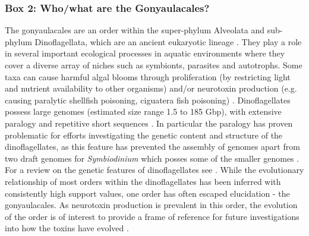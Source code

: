 \documentclass[12pt]{article}
\begin{document}
\subsubsection{Box 2: Who/what are the Gonyaulacales?}
\label{sec:dinobox}
The gonyaulacales are an order within the super-phylum Alveolata and sub-phylum Dinoflagellata, which are an ancient eukaryotic lineage \cite{moldowan1998biogeochemical}. 
They play a role in several important ecological processes in aquatic environments where they cover a diverse array of niches such as symbionts, parasites and autotrophs. 
Some taxa can cause harmful algal blooms through proliferation (by restricting light and nutrient availability to other organisms) and/or neurotoxin production (e.g. causing paralytic shellfish poisoning, ciguatera fish poisoning) \cite{murray2016unravelling}.
Dinoflagellates possess large genomes (estimated size range 1.5 to 185 Gbp), with extensive paralogy and repetitive short sequences  \cite{casabianca2017genome}. 
In particular the paralogy has proven problematic for efforts investigating the genetic content and structure of the dinoflagellates, as this feature has prevented the assembly of genomes apart from two draft genomes for \textit{Symbiodinium} which posses some of the smaller genomes \cite{shoguchi2013draft,lin2015symbiodinium}. 
For a review on the genetic features of dinoflagellates see \cite{murray2016unravelling}.
While the evolutionary relationship of most orders within the dinoflagellates has been inferred with consistently high support values, one order has often escaped elucidation - the gonyaulacales. 
As neurotoxin production is prevalent in this order, the evolution of the order is of interest to provide a frame of reference for future investigations into how the toxins have evolved \cite{shalchian2006combined,zhang2007three,saldarriaga2004molecular,hoppenrath2010dinoflagellate,murray2005improving}. 
\end{document}
